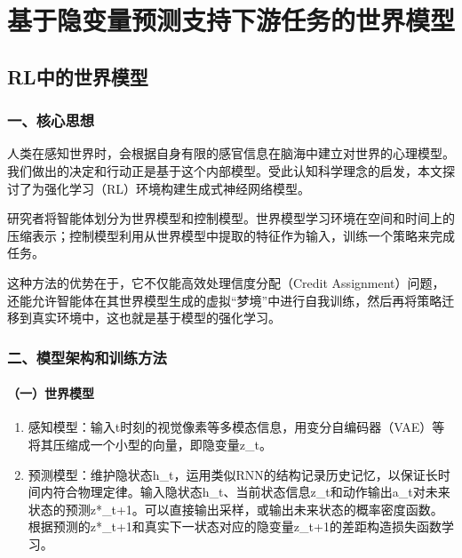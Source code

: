 \hypertarget{ux57faux4e8eux9690ux53d8ux91cfux9884ux6d4bux652fux6301ux4e0bux6e38ux4efbux52a1ux7684ux4e16ux754cux6a21ux578b}{%
\chapter{基于隐变量预测支持下游任务的世界模型}\label{ux57faux4e8eux9690ux53d8ux91cfux9884ux6d4bux652fux6301ux4e0bux6e38ux4efbux52a1ux7684ux4e16ux754cux6a21ux578b}}

\hypertarget{rlux4e2dux7684ux4e16ux754cux6a21ux578b}{%
\section{RL中的世界模型}\label{rlux4e2dux7684ux4e16ux754cux6a21ux578b}}

\hypertarget{ux4e00ux6838ux5fc3ux601dux60f3-23}{%
\subsection{一、核心思想}\label{ux4e00ux6838ux5fc3ux601dux60f3-23}}

人类在感知世界时，会根据自身有限的感官信息在脑海中建立对世界的心理模型。我们做出的决定和行动正是基于这个内部模型。受此认知科学理念的启发，本文探讨了为强化学习（RL）环境构建生成式神经网络模型。

研究者将智能体划分为世界模型和控制模型。世界模型学习环境在空间和时间上的压缩表示；控制模型利用从世界模型中提取的特征作为输入，训练一个策略来完成任务。

这种方法的优势在于，它不仅能高效处理信度分配（Credit Assignment）问题，还能允许智能体在其世界模型生成的虚拟``梦境''中进行自我训练，然后再将策略迁移到真实环境中，这也就是基于模型的强化学习。

\hypertarget{ux4e8cux6a21ux578bux67b6ux6784ux548cux8badux7ec3ux65b9ux6cd5}{%
\subsection{二、模型架构和训练方法}\label{ux4e8cux6a21ux578bux67b6ux6784ux548cux8badux7ec3ux65b9ux6cd5}}

\hypertarget{ux4e00ux4e16ux754cux6a21ux578b}{%
\subsubsection{（一）世界模型}\label{ux4e00ux4e16ux754cux6a21ux578b}}

\begin{enumerate}
\def\labelenumi{\arabic{enumi}.}
\item
  感知模型：输入t时刻的视觉像素等多模态信息，用变分自编码器（VAE）等将其压缩成一个小型的向量，即隐变量z\_t。
\item
  预测模型：维护隐状态h\_t，运用类似RNN的结构记录历史记忆，以保证长时间内符合物理定律。输入隐状态h\_t、当前状态信息z\_t和动作输出a\_t对未来状态的预测z*\_t+1。可以直接输出采样，或输出未来状态的概率密度函数。根据预测的z*\_t+1和真实下一状态对应的隐变量z\_t+1的差距构造损失函数学习。
\end{enumerate}

